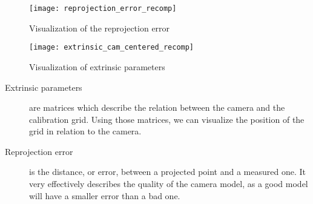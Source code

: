 \begin{figure}[h]
  \centering
  \texttt{[image: reprojection\_error\_recomp]}
  \caption{Visualization of the reprojection error}\label{fig:reprojection}
\end{figure}


\begin{figure}[h]
  \centering
  \texttt{[image: extrinsic\_cam\_centered\_recomp]}
  \caption{Visualization of extrinsic parameters}\label{fig:extrinsic}
\end{figure}

\begin{description}

  \item[Extrinsic parameters] are matrices which describe the relation
    between the camera and the calibration grid. Using those matrices, we can
    visualize the position of the grid in relation to the camera.

  \item[Reprojection error] is the distance, or error, between a projected
    point and a measured one. It very effectively describes the quality of the
    camera model, as a good model will have a smaller error than a bad one.

\end{description}
